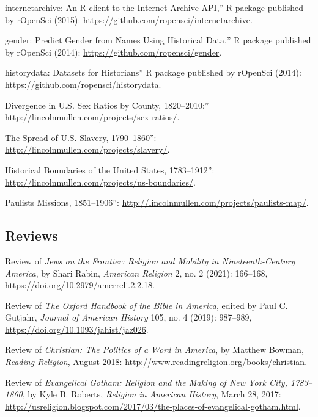 \documentclass[11pt]{article}
\begin{document}
\noindent{}internetarchive: An R client to the Internet Archive API,'' R package published by rOpenSci (2015): \url{https://github.com/ropensci/internetarchive}.

\noindent{}gender: Predict Gender from Names Using Historical Data,'' R package published by rOpenSci (2014): \url{https://github.com/ropensci/gender}.

\noindent{}historydata: Datasets for Historians'' R package published by rOpenSci (2014): \url{https://github.com/ropensci/historydata}.

\noindent{}Divergence in U.S. Sex Ratios by County, 1820--2010:'' \url{http://lincolnmullen.com/projects/sex-ratios/}.

\noindent{}The Spread of U.S.  Slavery, 1790--1860'':  \url{http://lincolnmullen.com/projects/slavery/}.

\noindent{}Historical Boundaries of the United States, 1783--1912'': \url{http://lincolnmullen.com/projects/us-boundaries/}.

\noindent{}Paulists Missions, 1851--1906'': \url{http://lincolnmullen.com/projects/paulists-map/}.


\subsection{Reviews}\label{Reviews}

Review of \emph{Jews on the Frontier: Religion and Mobility in Nineteenth-Century America}, by Shari Rabin, \emph{American Religion} 2, no. 2 (2021): 166--168, \url{https://doi.org/10.2979/amerreli.2.2.18}.

Review of \emph{The Oxford Handbook of the Bible in America}, edited by Paul C. Gutjahr, \emph{Journal of American History} 105, no. 4 (2019): 987--989, \url{https://doi.org/10.1093/jahist/jaz026}.

Review of \emph{Christian: The Politics of a Word in America}, by Matthew Bowman, \emph{Reading Religion}, August 2018: 
\url{http://www.readingreligion.org/books/christian}.

Review of \emph{Evangelical Gotham: Religion and the Making of New York City, 1783--1860}, by Kyle B. Roberts, \emph{Religion in American History}, March 28, 2017: \url{http://usreligion.blogspot.com/2017/03/the-places-of-evangelical-gotham.html}.
\end{document}

